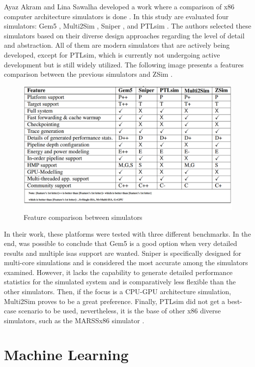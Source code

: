 Ayaz Akram and Lina Sawalha developed a work where a comparison of x86 computer architecture simulators is done \cite{akram2016comparison}. In 
this study are evaluated four simulators: Gem5 \cite{TheGem5Simulator}, Multi2Sim \cite{ubal2012multi2sim}, Sniper \cite{carlson2011sniper}, 
and PTLsim \cite{yourst2007ptlsim}. The authors selected these simulators based on their diverse design approaches regarding the level of 
detail and abstraction. All of them are modern simulators that are actively being developed, except for PTLsim, which is currently not 
undergoing active development but is still widely utilized. The following image presents a features comparison between the previous simulators 
and ZSim \cite{sanchez2013zsim}. 

\begin{figure}[H]
	\centering
 	\includegraphics[width=0.7\linewidth]{Images/ComparationTableSimulators.png}
 	\caption{Feature comparison between simulators \cite{akram2016comparison}}
	 \label{fig_ComparationTableSimulators}
\end{figure}

In their work, these platforms were tested with three different benchmarks. In the end, was possible to conclude that Gem5 is a good option 
when very detailed results and multiple \glspl{isa} support are wanted. Sniper is specifically designed for multi-core simulations and is 
considered the most accurate among the simulators examined. However, it lacks the capability to generate detailed performance statistics for 
the simulated system and is comparatively less flexible than the other simulators. Then, if the focus is a CPU-GPU architecture simulation, 
Multi2Sim proves to be a great preference. Finally, PTLsim did not get a best-case scenario to be used, nevertheless, it is the base of other 
x86 diverse simulators, such as the MARSSx86 simulator \cite{patel2011marss}.

\section{Machine Learning}

